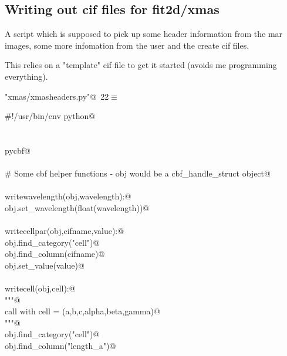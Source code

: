 \documentclass[10pt,a4paper,twoside,notitlepage]{article}
\begin{document}
\subsection{Writing out cif files for fit2d/xmas}

A script which is supposed to pick up some header information from the mar images, 
some more infomation from the user and the create cif files.

This relies on a "template" cif file to get it started (avoids me programming everything).

\begin{flushleft} \small
\begin{minipage}{\linewidth}\label{scrap19}\raggedright\small
{} \verb@"xmas/xmasheaders.py"@\nobreak\ {\footnotesize {22}}$\equiv$
\vspace{-1ex}
\begin{list}{}{} \item
\mbox{}\verb@#!/usr/bin/env python@\\
\mbox{}\verb@@\\
\mbox{}\verb@@\\
\mbox{}\verb@import pycbf@\\
\mbox{}\verb@@\\
\mbox{}\verb@# Some cbf helper functions - obj would be a cbf_handle_struct object@\\
\mbox{}\verb@@\\
\mbox{}\verb@def writewavelength(obj,wavelength):@\\
\mbox{}\verb@    obj.set_wavelength(float(wavelength))@\\
\mbox{}\verb@@\\
\mbox{}\verb@def writecellpar(obj,cifname,value):@\\
\mbox{}\verb@    obj.find_category("cell")@\\
\mbox{}\verb@    obj.find_column(cifname)@\\
\mbox{}\verb@    obj.set_value(value)@\\
\mbox{}\verb@@\\
\mbox{}\verb@def writecell(obj,cell):@\\
\mbox{}\verb@    """@\\
\mbox{}\verb@    call with cell = (a,b,c,alpha,beta,gamma)@\\
\mbox{}\verb@    """@\\
\mbox{}\verb@    obj.find_category("cell")@\\
\mbox{}\verb@    obj.find_column("length_a")@\\

\end{list}
\end{minipage}
\end{flushleft}
\end{document}
